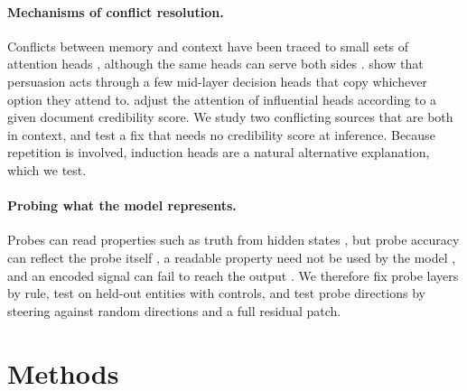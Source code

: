 \documentclass[11pt]{article}
\begin{document}
\paragraph{Mechanisms of conflict resolution.}
Conflicts between memory and context have been traced to small sets of attention heads \citep{yu2023characterizing,jin2024cutting,ortu2024competition}, although the same heads can serve both sides \citep{li2025taming}.
\citet{sun2026persuaded} show that persuasion acts through a few mid-layer decision heads that copy whichever option they attend to.
\citet{deng2025cram} adjust the attention of influential heads according to a given document credibility score.
We study two conflicting sources that are both in context, and test a fix that needs no credibility score at inference. Because repetition is involved, induction heads \citep{olsson2022induction} are a natural alternative explanation, which we test.

\paragraph{Probing what the model represents.}
Probes can read properties such as truth from hidden states \citep{burns2023discovering,azaria2023internal,marks2024geometry}, but probe accuracy can reflect the probe itself \citep{hewitt2019control}, a readable property need not be used by the model \citep{ravichander2021probing,belinkov2022probing}, and an encoded signal can fail to reach the output \citep{ding2026tongue}.
We therefore fix probe layers by rule, test on held-out entities with controls, and test probe directions by steering \citep{rimsky2024caa,li2023iti} against random directions and a full residual patch.

\section{Methods}
\end{document}
